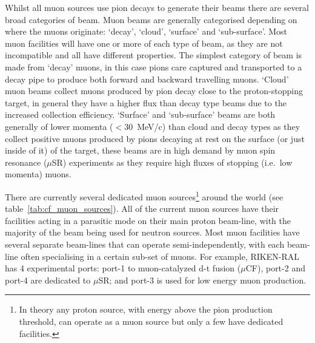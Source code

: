 Whilst all muon sources use pion decays to generate their beams there are several broad categories of beam. Muon beams are generally categorised depending on where the muons originate: `decay', `cloud', `surface' and `sub-surface'. Most muon facilities will have one or more of each type of beam, as they are not incompatible and all have different properties. The simplest category of beam is made from `decay' muons, in this case pions care captured and transported to a decay pipe to produce both forward and backward travelling muons. `Cloud' muon beams collect muons produced by pion decay close to the proton-stopping target, in general they have a higher flux than decay type beams due to the increased collection efficiency. `Surface' and `sub-surface' beams are both generally of lower momenta (\( <30\)~MeV/c) than cloud and decay types as they collect positive muons produced by pions decaying at rest on the surface (or just inside of it) of the target, these beams are in high demand by muon spin resonance (\(\mu\)SR) experiments as they require high fluxes of stopping (i.e.\ low momenta) muons.

There are currently several dedicated muon sources\footnote{In theory any proton source, with energy above the pion production threshold, can operate as a muon source but only a few have dedicated facilities.} around the world (see table~\ref{tab:cf_muon_sources}). All of the current muon sources have their facilities acting in a parasitic mode on their main proton beam-line, with the majority of the beam being used for neutron sources. Most muon facilities have several separate beam-lines that can operate semi-independently, with each beam-line often specialising in a certain sub-set of muons. For example, RIKEN-RAL has 4 experimental ports: port-1 to muon-catalyzed d-t fusion (\(\mu\)CF), port-2 and port-4 are dedicated to \(\mu\)SR; and port-3 is used for low energy muon production.


